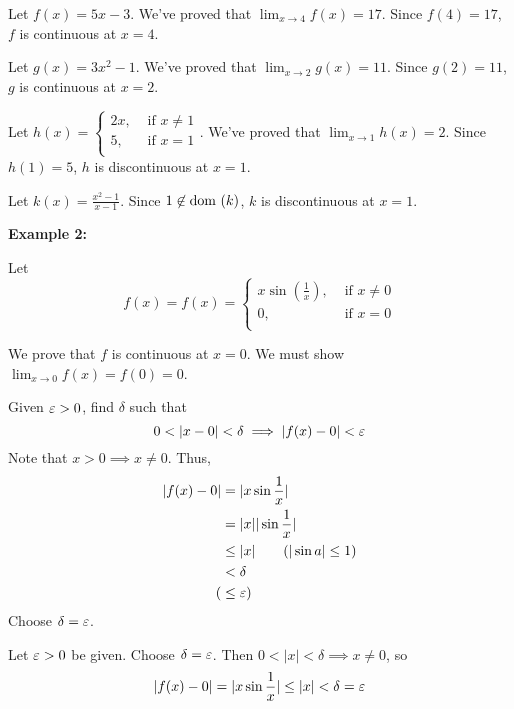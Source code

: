 \documentclass{article}
\begin{document}
\begin{examples}
Let $f(x) = 5x-3$. We've proved that $\lim_{x\to 4} f(x) = 17$. Since $f(4) = 17$, $f$ is continuous at $x=4$.

Let $g(x) = 3x^2-1$. We've proved that $\lim_{x\to 2} g(x) = 11$. Since $g(2) = 11$, $g$ is continuous at $x=2$.

Let $h(x) = \begin{cases}
    2x, &\text{ if } x \not= 1\\
    5, &\text{ if } x=1\\
\end{cases}$. We've proved that $\lim_{x\to 1} h(x) = 2$. Since $h(1) = 5$, $h$ is discontinuous at $x=1$.

Let $k(x) = \frac{x^2-1}{x-1}$. Since $1 \not\in\text{dom }(k)$, $k$ is discontinuous at $x=1$.

\textbf{Example 2:}

Let \[
f(x) = f(x) = \begin{cases}
    x \sin (\frac{1}{x}), &\text{ if } x \not= 0\\
    0, &\text{ if } x=0\\
\end{cases}
\]
\begin{center}
\end{center}

We prove that $f$ is continuous at $x=0$. We must show $\lim_{x\to 0} f(x)= f(0) = 0$.

Given $\varepsilon > 0$, find $\delta$ such that \[
0 < |x-0| < \delta \implies |f(x) - 0| < \varepsilon
\]
Note that $x > 0 \implies x \not = 0$.
Thus,  \begin{align*}
    |f(x)-0| &= |x\sin{\frac{1}{x}}|\\
    &= |x| |\sin{\frac{1}{x}}|\\
    &\leq |x| \tag{$|\sin{a}| \leq 1$}\\
    &< \delta\\
    (&\leq \ep)\\
\end{align*}
Choose $\delta = \varepsilon$.

Let $\varepsilon > 0$ be given. Choose $\delta = \varepsilon$. Then $0 < |x| < \delta \implies x \not = 0$, so \[
|f(x)-0| = |x\sin{\frac{1}{x}}| \leq |x| < \delta = \varepsilon
\]
\end{examples}
\end{document}
